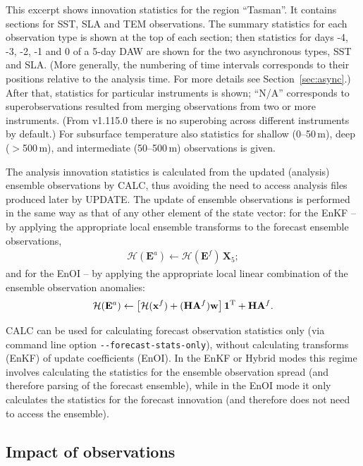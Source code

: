 \documentclass[11pt]{report}
\newcommand{\mb} {\mathbf}
\newcommand{\T}{^{\tiny \mathrm T}}
\begin{document}
This excerpt shows innovation statistics for the region ``Tasman''.
It contains sections for SST, SLA and TEM observations.
The summary statistics for each observation type is shown at the top of each section; then statistics for days -4, -3, -2, -1 and 0 of a 5-day DAW are shown for the two asynchronous types, SST and SLA.
(More generally, the numbering of time intervals corresponds to their positions relative to the analysis time.
For more details see Section~\ref{sec:async}.)
After that, statistics for particular instruments is shown; ``N/A'' corresponds to superobservations resulted from merging observations from two or more instruments.
(From v1.115.0 there is no superobing across different instruments by default.)
For subsurface temperature also statistics for shallow (0--50\,m), deep ($>$500\,m), and intermediate (50--500\,m) observations is given.

The analysis innovation statistics is calculated from the updated (analysis) ensemble observations by CALC, thus avoiding the need to access analysis files produced later by UPDATE.
The update of ensemble observations is performed in the same way as that of any other element of the state vector:
for the EnKF -- by applying the appropriate local ensemble transforms to the forecast ensemble observations,
\begin{align*}
  \mathcal H (\mb E^a) \leftarrow \mathcal H (\mb E^f) \, \mb X_5;
\end{align*}
and for the EnOI -- by applying the appropriate local linear combination of the ensemble observation anomalies:
\begin{align*}
  \mathcal H (\mb E^a) \leftarrow \left[ \mathcal H (\mb x^f) + (\mb H \mb A^f) \mb w\right] \mb 1\T + \mb H \mb A^f.
\end{align*}

CALC can be used for calculating forecast observation statistics only (via command line option \verb|--forecast-stats-only|), without calculating transforms (EnKF) of update coefficients (EnOI).
In the EnKF or Hybrid modes this regime involves calculating the statistics for the ensemble observation spread (and therefore parsing of the forecast ensemble), while in the EnOI mode it only calculates the statistics for the forecast innovation (and therefore does not need to access the ensemble).

\subsection{Impact of observations}
\label{sec:impact}
\end{document}
